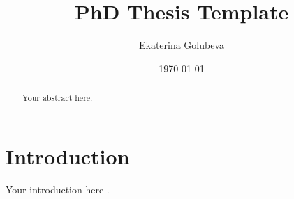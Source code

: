 \documentclass{article}
\title{PhD Thesis Template}
\author{Ekaterina Golubeva}
\date{\today}
\begin{document}
\maketitle

\begin{abstract}
Your abstract here.
\end{abstract}

\section{Introduction}
Your introduction here \cite{example}.



\end{document}
